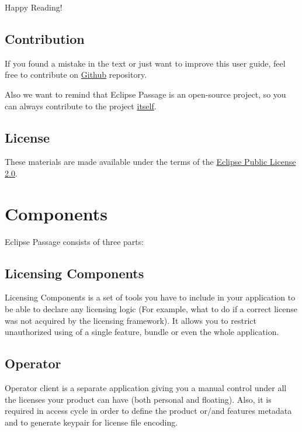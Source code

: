 \documentclass[12pt]{report}
\begin{document}
Happy Reading!

\section*{Contribution}

If you found a mistake in the text or just want to improve this user guide, feel free to contribute on \href{https://github.com/eclipse-passage/passage-docs}{Github} repository.

Also we want to remind that Eclipse Passage is an open-source project, so you can always contribute to the project \href{https://github.com/eclipse-passage/passage}{itself}.

\section*{License}

These materials are made available under the terms of the \href{https://www.eclipse.org/legal/epl-2.0/}{Eclipse Public License 2.0}.

\chapter*{Components}

Eclipse Passage consists of three parts:

\section*{Licensing Components}

Licensing Components is a set of tools you have to include in your application to be able to declare any licensing logic (For example, what to do if a correct license was not acquired by the licensing framework).
It allows you to restrict unauthorized using of a single feature, bundle or even the whole application.

\section*{Operator}

Operator client is a separate application giving you a manual control under all the licenses your product can have (both personal and floating). Also, it is required
in access cycle in order to define the product or/and features metadata and to generate keypair for license file encoding.
\end{document}
